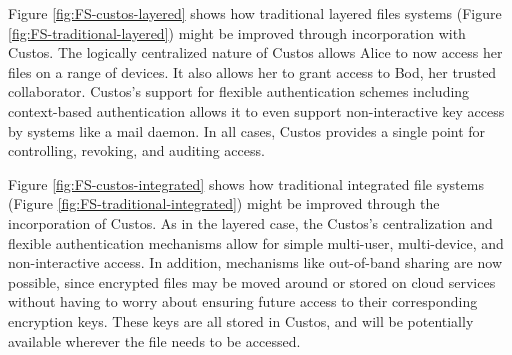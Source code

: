 Figure \ref{fig:FS-custos-layered} shows how traditional layered files
systems (Figure \ref{fig:FS-traditional-layered}) might be improved
through incorporation with Custos. The logically centralized nature of
Custos allows Alice to now access her files on a range of devices. It
also allows her to grant access to Bod, her trusted
collaborator. Custos's support for flexible authentication schemes
including context-based authentication allows it to even support
non-interactive key access by systems like a mail daemon. In all
cases, Custos provides a single point for controlling, revoking, and
auditing access.

Figure \ref{fig:FS-custos-integrated} shows how traditional integrated
file systems (Figure \ref{fig:FS-traditional-integrated}) might be
improved through the incorporation of Custos. As in the layered case,
the Custos's centralization and flexible authentication mechanisms
allow for simple multi-user, multi-device, and non-interactive
access. In addition, mechanisms like out-of-band sharing are now
possible, since encrypted files may be moved around or stored on cloud
services without having to worry about ensuring future access to their
corresponding encryption keys. These keys are all stored in Custos,
and will be potentially available wherever the file needs to be
accessed.

